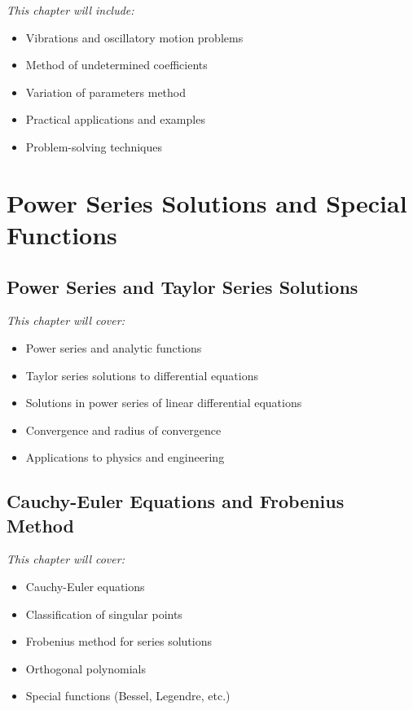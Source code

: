 \documentclass[12pt, letterpaper]{book}
\theoremstyle{problemstyle}
\theoremstyle{solutionstyle}
\begin{document}
\textit{This chapter will include:}
\begin{itemize}
    \item Vibrations and oscillatory motion problems
    \item Method of undetermined coefficients
    \item Variation of parameters method
    \item Practical applications and examples
    \item Problem-solving techniques
\end{itemize}

\part{Power Series Solutions and Special Functions}
\label{part:power_series_special_functions}

\chapter{Power Series and Taylor Series Solutions}
\label{chap:session_8}

\textit{This chapter will cover:}
\begin{itemize}
    \item Power series and analytic functions
    \item Taylor series solutions to differential equations
    \item Solutions in power series of linear differential equations
    \item Convergence and radius of convergence
    \item Applications to physics and engineering
\end{itemize}

\chapter{Cauchy-Euler Equations and Frobenius Method}
\label{chap:session_9}

\textit{This chapter will cover:}
\begin{itemize}
    \item Cauchy-Euler equations
    \item Classification of singular points
    \item Frobenius method for series solutions
    \item Orthogonal polynomials
    \item Special functions (Bessel, Legendre, etc.)
\end{itemize}
\end{document}
